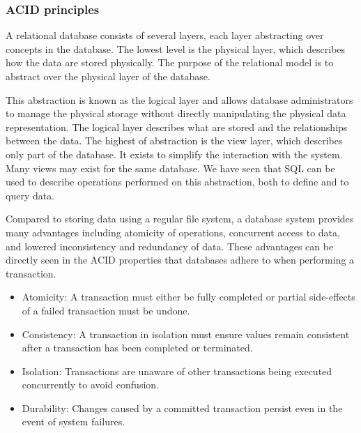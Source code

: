 \subsubsection*{ACID principles}\label{sec:ACID}

A relational database consists of several layers, each layer abstracting over concepts in the database.
The lowest level is the physical layer, which describes how the data are stored physically.
The purpose of the relational model is to abstract over the physical layer of the database.

This abstraction is known as the logical layer and allows database administrators to manage the physical storage without directly manipulating the physical data representation.
The logical layer describes what are stored and the relationships between the data.
The highest of abstraction is the view layer, which describes only part of the database.
It exists to simplify the interaction with the system. Many views may exist for the same database.
\cite{DBSBook}
We have seen that SQL can be used to describe operations performed on this abstraction, both to define and to query data.

Compared to storing data using a regular file system, a database system provides many advantages including atomicity of operations, concurrent access to data, and lowered inconsistency and redundancy of data\cite{DBSBook}.
These advantages can be directly seen in the ACID properties that databases adhere to when performing a transaction\cite{DBSBook}.
\begin{itemize} \label{ACID}
    \item Atomicity: A transaction must either be fully completed or partial side-effects of a failed transaction must be undone.
    \item Consistency: A transaction in isolation must ensure values remain consistent after a transaction has been completed or terminated.
    \item Isolation: Transactions are unaware of other transactions being executed concurrently to avoid confusion.
    \item Durability: Changes caused by a committed transaction persist even in the event of system failures.
\end{itemize}
